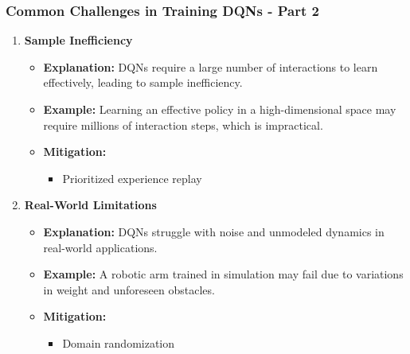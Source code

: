 \documentclass[aspectratio=169]{beamer}
\begin{document}
\begin{frame}[fragile]
    \frametitle{Common Challenges in Training DQNs - Part 2}
    
    \begin{enumerate}[resume]
        \item \textbf{Sample Inefficiency}
        \begin{itemize}
            \item \textbf{Explanation:} DQNs require a large number of interactions to learn effectively, leading to sample inefficiency.
            \item \textbf{Example:} Learning an effective policy in a high-dimensional space may require millions of interaction steps, which is impractical.
            \item \textbf{Mitigation:} 
                \begin{itemize}
                    \item Prioritized experience replay
                \end{itemize}
        \end{itemize}
        
        \item \textbf{Real-World Limitations}
        \begin{itemize}
            \item \textbf{Explanation:} DQNs struggle with noise and unmodeled dynamics in real-world applications.
            \item \textbf{Example:} A robotic arm trained in simulation may fail due to variations in weight and unforeseen obstacles.
            \item \textbf{Mitigation:} 
                \begin{itemize}
                    \item Domain randomization
                \end{itemize}
        \end{itemize}
    \end{enumerate}
\end{frame}
\end{document}
